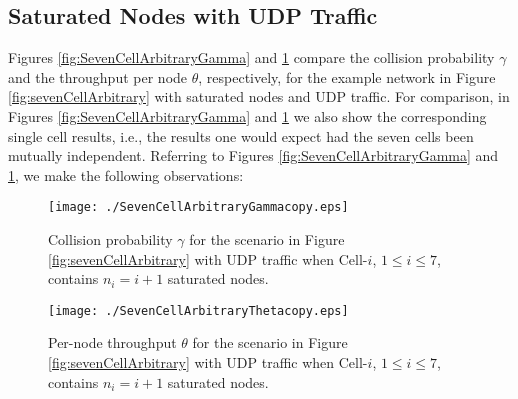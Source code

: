 \documentclass[10pt,a4paper,journal]{IEEEtran}
\theoremstyle{definition}
\theoremstyle{remark}
\theoremstyle{plain}
\begin{document}
\subsection{Saturated Nodes with UDP Traffic}
\label{subsec:results-saturated}

Figures \ref{fig:SevenCellArbitraryGamma} and \ref{fig:SevenCellArbitraryTheta} compare the collision probability $\gamma$ and the throughput per node $\theta$, respectively, for the example network in Figure \ref{fig:sevenCellArbitrary} with saturated nodes and UDP traffic. For comparison, in Figures \ref{fig:SevenCellArbitraryGamma} and \ref{fig:SevenCellArbitraryTheta} we also show the corresponding single cell results, i.e., the results one would expect had the seven cells been mutually independent. Referring to Figures \ref{fig:SevenCellArbitraryGamma} and \ref{fig:SevenCellArbitraryTheta}, we make the following observations: 



\begin{figure}[tb]
\centering
\begin{minipage}{8.25cm}
\begin{center}
\texttt{[image: ./SevenCellArbitraryGammacopy.eps]}
\caption{Collision probability $\gamma$ for the scenario in Figure \ref{fig:sevenCellArbitrary} with UDP traffic when Cell-$i$, $1 \leq i \leq 7$, contains $n_i = i+1$ saturated nodes.\label{fig:SevenCellArbitraryGamma}}
\vspace{2mm}
\end{center}
\end{minipage}
\hfill
\begin{minipage}{8.25cm}
\begin{center}
\texttt{[image: ./SevenCellArbitraryThetacopy.eps]}
\caption{Per-node throughput $\theta$ for the scenario in Figure \ref{fig:sevenCellArbitrary} with UDP traffic when Cell-$i$, $1 \leq i \leq 7$, contains $n_i = i+1$ saturated nodes.\label{fig:SevenCellArbitraryTheta}}
\end{center}
\end{minipage}
\end{figure}
\end{document}
